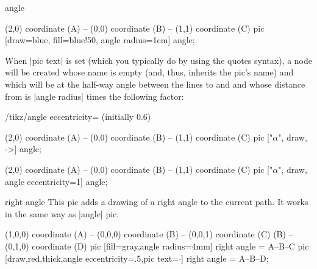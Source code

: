 \begin{pictype}{angle}{}
\begin{codeexample}[]
\tikz \draw [line width=2mm]
      (2,0) coordinate (A) -- (0,0) coordinate (B)
   -- (1,1) coordinate (C)
     pic [draw=blue, fill=blue!50, angle radius=1cm] {angle};
\end{codeexample}

  When |pic text| is set (which you typically do by using the quotes
  syntax), a node will be created whose name is empty 
  (and, thus, inherits the pic's name) and which will be at the
  half-way angle between the lines to  and  and whose
  distance from  is |angle radius| times the following factor:
  \begin{key}{/tikz/angle eccentricity= (initially 0.6)}
\begin{codeexample}[]
\tikz \draw (2,0) coordinate (A) -- (0,0) coordinate (B)
         -- (1,1) coordinate (C)
  pic ["$\alpha$", draw, ->] {angle};
\end{codeexample}        
\begin{codeexample}[]
\tikz \draw (2,0) coordinate (A) -- (0,0) coordinate (B)
         -- (1,1) coordinate (C)
  pic ["$\alpha$", draw, angle eccentricity=1] {angle};
\end{codeexample}        
\begin{codeexample}[]
\end{codeexample}        
  \end{key}  
\end{pictype}

\begin{pictype}{right angle}{}
  This pic adds a drawing of a right angle to the current path. It works in the same way as |angle| pic.
\begin{codeexample}[]
  \tikz 
    \draw (1,0,0) coordinate (A) -- (0,0,0) coordinate (B) -- (0,0,1) coordinate (C)
      (B) -- (0,1,0) coordinate (D)
      pic [fill=gray,angle radius=4mm] {right angle = A--B--C}
      pic [draw,red,thick,angle eccentricity=.5,pic text=$\cdot$] 
        {right angle = A--B--D};
\end{codeexample}
\end{pictype}


